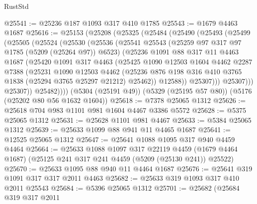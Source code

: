 \begin{lexlean}{RustStd}
\begin{coremodule}
@25541 := @25236 @187 @1093 @317 @410 @1785
@25543 := @1679 @4463 @1687
@25616 := @25153
    (@25208
      (@25325
        (@25484
          (@25490
            (@25493
              (@25499
                (@25505
                  (@25524
                    (@25530
                      (@25536
                        (@25541
                          @25543
                          (@25259 @97 @317 @97 @1785 (@5209 (@25264 @97)) @6523)
                          (@25236
                            @1091
                            @88
                            @317
                            @11
                            @4463
                            @1687
                            (@25420
                              @1091
                              @317
                              @4463
                              (@25425
                                @1090
                                @12503
                                @1604
                                @4462
                                @2287
                                @7388
                                (@25231
                                  @1090
                                  @12503
                                  @4462
                                  (@25236
                                    @876
                                    @198
                                    @316
                                    @410
                                    @3765
                                    @1838
                                    (@25294 @3765 @25297 @21212)
                                    @25462))
                                @12588))
                            @25307)))
                      @25307)))
                @25307))
            @25482))))
    (@5304 (@25191 @49))
    (@5329 (@25195 @57 @80))
    (@5176 (@25202 @80 @56 @1632 @1604))
@25618 := @7378 @25065 @1312
@25626 := @25618 @704 @983 @1101 @981 @1604 @4467 @3386 @5572
@25628 := @5375 @25065 @1312
@25631 := @25628 @1101 @981 @4467
@25633 := @5384 @25065 @1312
@25639 := @25633 @1099 @88 @941 @11 @4465 @1687
@25641 := @12525 @25065 @1312
@25647 := @25641 @1088 @1095 @317 @940 @4459 @4464
@25664 := @25633
    @1088
    @1097
    @317
    @22119
    @4459
    (@1679 @4464 @1687)
    (@25125 @241 @317 @241 @4459 (@5209 (@25130 @241)) @25522)
@25670 := @25633 @1095 @88 @940 @11 @4464 @1687
@25676 := @25641 @319 @1091 @317 @317 @2011 @4463
@25682 := @25633 @319 @1093 @317 @410 @2011 @25543
@25684 := @5396 @25065 @1312
@25701 := @25682
    (@25684
      @319
      @317
      @2011

\end{coremodule}
\end{lexlean}
